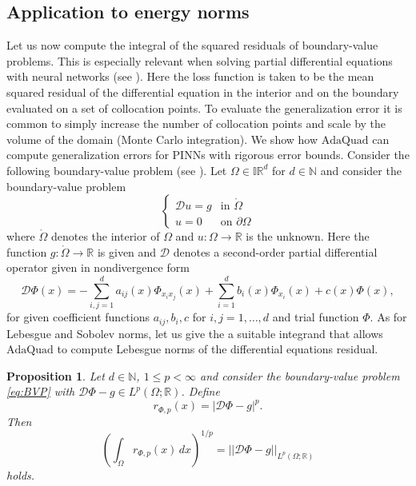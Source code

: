 \documentclass[a4paper, 11pt]{article}
\newtheorem{proposition}[theorem]{Proposition}
\begin{document}
	
	
	\subsection{Application to energy norms}
	Let us now compute the integral of the squared residuals of boundary-value problems. 
	This is especially relevant when solving partial differential equations with neural networks (see \cite{raissi2019pinns}). Here the loss function is taken to be the mean squared residual of the differential equation in the interior and on the boundary evaluated on a set of collocation points. To evaluate the generalization error it is common to simply increase the number of collocation points and scale by the volume of the domain (Monte Carlo integration). We show how $\mathrm{AdaQuad}$ can compute generalization errors for PINNs with rigorous error bounds. Consider the following boundary-value problem (see \cite[Chapter 6]{evans2022partial}). Let $\Omega \in \mathbb{IR}^d$ for $d \in \mathbb{N}$ and consider the boundary-value problem
	\begin{equation}
		\begin{cases}\label{eq:BVP}
			\mathcal{D}u= g & \text{in } \mathring{\Omega} \\
			u = 0 & \text{on } \partial\Omega
		\end{cases}
	\end{equation}
	where $\mathring{\Omega}$ denotes the interior of $\Omega$ and $u: \Omega \to \mathbb{R}$ is the unknown. Here the function $g: \mathring{\Omega} \to \mathbb{R}$ is given and $\mathcal{D}$ denotes a second-order partial differential operator given in nondivergence form
	\begin{equation}\label{eq:DiffOperator}
		\mathcal{D}\Phi(x) = - \sum_{i,j=1}^d a_{ij}(x) \Phi_{x_i x_j}(x)  + \sum_{i=1}^d b_i(x) \Phi_{x_i}(x) + c(x)\Phi(x),
	\end{equation}
	for given coefficient functions $a_{ij}, b_i,c$ for $i,j=1, \dotsc, d$ and trial function $\Phi$. As for Lebesgue and Sobolev norms, let us give the a suitable integrand that allows $\mathrm{AdaQuad}$ to compute Lebesgue norms of the differential equations residual.

    \begin{proposition}\label{prop: energy integrand}
        Let $d \in \mathbb{N}$, $1 \leq p < \infty$ and consider the boundary-value problem \eqref{eq:BVP} with $\mathcal{D}\Phi -g \in L^p(\Omega; \mathbb{R})$. Define
        \begin{equation}
            r_{\Phi, p}(x) = |\mathcal{D}\Phi - g|^p.
        \end{equation}
        Then
        \begin{equation*}
        \left(\int_\Omega r_{\Phi, p}(x) \, dx\right)^{1/p} = ||\mathcal{D}\Phi - g||_{L^p(\Omega; \mathbb{R})}
        \end{equation*}
        holds.
    \end{proposition}
\end{document}
